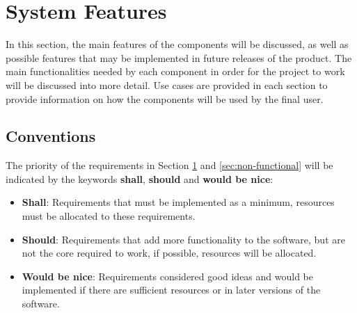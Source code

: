 \section{System Features}
\label{sec:system-features}

In this section, the main features of the components will be discussed, as well as possible features that may be implemented in future releases of the product.
The main functionalities needed by each component in order for the project to work will be discussed into more detail. \newline
Use cases are provided in each section to provide information on how the components will be used by the final user. 

\subsection{Conventions}

The priority of the requirements in Section \ref{sec:system-features} and \ref{sec:non-functional} will be indicated by the keywords \textbf{shall}, \textbf{should} and \textbf{would be nice}:

\begin{itemize}
	\item \textbf{Shall}: Requirements that must be implemented as a minimum, resources must be allocated to these requirements.
	\item \textbf{Should}: Requirements that add more functionality to the software, but are not the core required to work, if possible, resources will be allocated.
	\item \textbf{Would be nice}: Requirements considered good ideas and would be implemented if there are sufficient resources or in later versions of the software.
\end{itemize}






